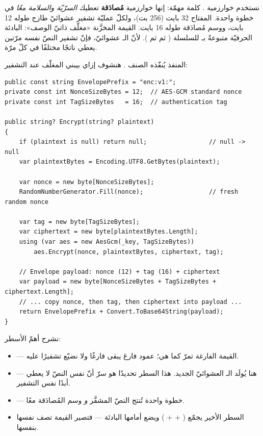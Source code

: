 \begin{idea}
نستخدم خوارزمية . كلمة  مهمّة: إنها خوارزمية
\textbf{مُصادَقة}  تعطيك \emph{السرّيّة والسلامة معًا} في خطوة واحدة.
المفتاح 32 بايت (256 بت)، ولكلّ عمليّة تشفير  عشوائيّ طازج طوله 12 بايت،
ووسم مُصادَقة  طوله 16 بايت. القيمة المخزَّنة «مغلّف ذاتيّ الوصف»:
البادئة الحرفيّة  متبوعةً بـ  للسلسلة
( ثم  ثم ). لأنّ الـ  عشوائيّ، فإنّ تشفير
النصّ نفسه مرّتين يعطي ناتجًا مختلفًا في كلّ مرّة.
\end{idea}

المنفذ  يُنفّذه الصنف .
هنشوف إزاي بيبني المغلّف عند التشفير:

\begin{english}
\begin{lstlisting}[language={[Sharp]C}]
public const string EnvelopePrefix = "enc:v1:";
private const int NonceSizeBytes = 12;  // AES-GCM standard nonce
private const int TagSizeBytes   = 16;  // authentication tag

public string? Encrypt(string? plaintext)
{
    if (plaintext is null) return null;                 // null -> null
    var plaintextBytes = Encoding.UTF8.GetBytes(plaintext);

    var nonce = new byte[NonceSizeBytes];
    RandomNumberGenerator.Fill(nonce);                  // fresh random nonce

    var tag = new byte[TagSizeBytes];
    var ciphertext = new byte[plaintextBytes.Length];
    using (var aes = new AesGcm(_key, TagSizeBytes))
        aes.Encrypt(nonce, plaintextBytes, ciphertext, tag);

    // Envelope payload: nonce (12) + tag (16) + ciphertext
    var payload = new byte[NonceSizeBytes + TagSizeBytes + ciphertext.Length];
    // ... copy nonce, then tag, then ciphertext into payload ...
    return EnvelopePrefix + Convert.ToBase64String(payload);
}
\end{lstlisting}
\end{english}

نشرح أهمّ الأسطر:
\begin{itemize}
\item {} — القيمة الفارغة تمرّ كما هي؛ عمود
  فارغ يبقى فارغًا ولا نضيّع تشفيرًا عليه.
\item {} — هنا يُولَد الـ  العشوائيّ
  الجديد. هذا السطر تحديدًا هو سرّ أنّ نفس النصّ لا يعطي أبدًا نفس التشفير.
\item {} — خطوة واحدة تُنتج
  النصّ المشفَّر \emph{و} وسم المُصادَقة معًا.
\item السطر الأخير يجمّع ( +  + ) ويضع أمامها
  البادئة  — فتصير القيمة تصف نفسها بنفسها.
\end{itemize}

